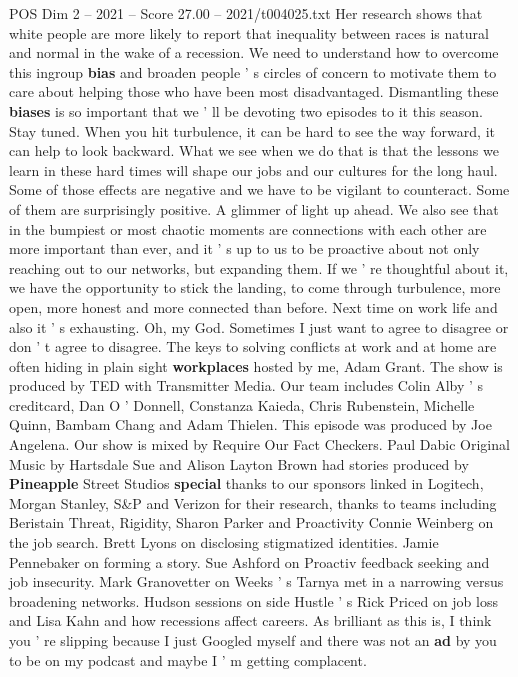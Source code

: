\begin{textsample}{POS Dim 2 – 2021 – Score 27.00 – 2021/t004025.txt}
Her research shows that white people are more likely to report that inequality between races is natural and normal in the wake of a recession.
We need to understand how to overcome this ingroup \textbf{bias} and broaden people ' s circles of concern to motivate them to care about helping those who have been most disadvantaged.
Dismantling these \textbf{biases} is so important that we ' ll be devoting two episodes to it this season.
Stay tuned.
When you hit turbulence, it can be hard to see the way forward, it can help to look backward.
What we see when we do that is that the lessons we learn in these hard times will shape our jobs and our cultures for the long haul.
Some of those effects are negative and we have to be vigilant to counteract.
Some of them are surprisingly positive.
A glimmer of light up ahead.
We also see that in the bumpiest or most chaotic moments are connections with each other are more important than ever, and it ' s up to us to be proactive about not only reaching out to our networks, but expanding them.
If we ' re thoughtful about it, we have the opportunity to stick the landing, to come through turbulence, more open, more honest and more connected than before.
Next time on work life and also it ' s exhausting.
Oh, my God.
Sometimes I just want to agree to disagree or don ' t agree to disagree.
The keys to solving conflicts at work and at home are often hiding in plain sight \textbf{workplaces} hosted by me, Adam Grant.
The show is produced by TED with Transmitter Media.
Our team includes Colin Alby ' s creditcard, Dan O ' Donnell, Constanza Kaieda, Chris Rubenstein, Michelle Quinn, Bambam Chang and Adam Thielen.
This episode was produced by Joe Angelena.
Our show is mixed by Require Our Fact Checkers.
Paul Dabic Original Music by Hartsdale Sue and Alison Layton Brown had stories produced by \textbf{Pineapple} Street Studios \textbf{special} thanks to our sponsors linked in Logitech, Morgan Stanley, S\&P and Verizon for their research, thanks to teams including Beristain Threat, Rigidity, Sharon Parker and Proactivity Connie Weinberg on the job search.
Brett Lyons on disclosing stigmatized identities.
Jamie Pennebaker on forming a story.
Sue Ashford on Proactiv feedback seeking and job insecurity.
Mark Granovetter on Weeks ' s Tarnya met in a narrowing versus broadening networks.
Hudson sessions on side Hustle ' s Rick Priced on job loss and Lisa Kahn and how recessions affect careers.
As brilliant as this is, I think you ' re slipping because I just Googled myself and there was not an \textbf{ad} by you to be on my podcast and maybe I ' m getting complacent.

\end{textsample}
